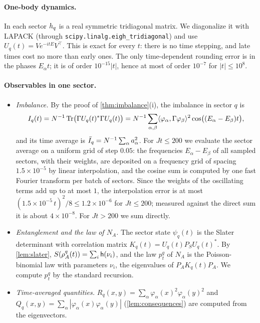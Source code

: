 \paragraph{One-body dynamics.}  In each sector $h_{q}$ is a real symmetric tridiagonal matrix.  We
diagonalize it with LAPACK (through \texttt{scipy.linalg.eigh\_tridiagonal}) and use
$U_q(t)=Ve^{-itE}V^{\top}$.  This is exact for every $t$: there is no time stepping, and late times cost no
more than early ones.  The only time-dependent rounding error is in the phases $E_\alpha t$; it is of
order $10^{-15}|t|$, hence at most of order $10^{-7}$ for $|t|\le10^8$.

\paragraph{Observables in one sector.}
\begin{itemize}
\item \emph{Imbalance.}  By the proof of \cref{thm:imbalance}(i), the imbalance in sector $q$ is
\[
  I_q(t)=N^{-1}\operatorname{Tr}\bigl(\Gamma U_q(t)^*\Gamma U_q(t)\bigr)
  =N^{-1}\sum_{\alpha,\beta}\langle\varphi_\alpha,\Gamma\varphi_\beta\rangle^2\cos\bigl((E_\alpha-E_\beta)t\bigr),
\]
and its time average is $\bar I_q=N^{-1}\sum_\alpha a_\alpha^2$.  For $Jt\le200$ we
evaluate the sector average on a uniform grid of step $0.05$: the frequencies $E_\alpha-E_\beta$ of all sampled
sectors, with their weights, are deposited on a frequency grid of spacing $1.5\times10^{-5}$ by linear
interpolation, and the cosine sum is computed by one fast Fourier transform per batch of sectors.  Since the weights of
the oscillating terms add up to at most $1$, the interpolation error is at most $(1.5\times10^{-5}\,t)^2/8\le1.2\times10^{-6}$
for $Jt\le200$; measured against the direct sum it is about $4\times10^{-8}$.  For $Jt>200$ we sum directly.
\item \emph{Entanglement and the law of $N_A$.}  The sector state $\psi_q(t)$ is the Slater determinant with
correlation matrix $K_q(t)=U_q(t)P_SU_q(t)^*$.  By \cref{lem:slater}, $S(\rho^q_A(t))=\sum_i\mathsf{h}(\nu_i)$, and the
law $p^q_t$ of $N_A$ is the Poisson-binomial law with parameters $\nu_i$, the eigenvalues of
$P_AK_q(t)P_A$.  We compute $p^q_t$ by the standard recursion.
\item \emph{Time-averaged quantities.}  $R_q(x,y)=\sum_\alpha\varphi_\alpha(x)^2\varphi_\alpha(y)^2$ and
$Q_q(x,y)=\sum_\alpha|\varphi_\alpha(x)\varphi_\alpha(y)|$ (\cref{lem:consequences}) are computed from the eigenvectors.
\end{itemize}

